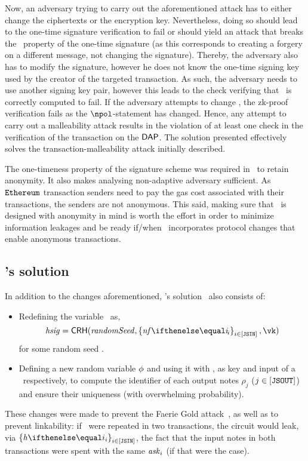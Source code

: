 Now, an adversary trying to carry out the aforementioned attack has to either change the ciphertexts or the encryption key. Nevertheless, doing so should lead to the one-time signature verification to fail or should yield an attack that breaks the \ufcma~property of the one-time signature (as this corresponds to creating a forgery on a different message, not changing the signature). Thereby, the adversary also has to modify the signature, however he does not know the one-time signing key used by the creator of the targeted transaction. As such, the adversary needs to use another signing key pair, however this leads to the check verifying that \hsig~is correctly computed to fail. If the adversary attempts to change \hsig, the zk-proof verification fails as the $\npol$-statement has changed. Hence, any attempt to carry out a malleability attack results in the violation of at least one check in the verification of the transaction on the $\mathsf{DAP}$. The solution presented effectively solves the transaction-malleability attack initially described.

\begin{remark}
    The one-timeness property of the signature scheme was required in \zerocash~to retain anonymity. It also makes analysing non-adaptive adversary sufficient. As $\texttt{Ethereum}{}$ transaction senders need to pay the gas cost associated with their transactions, the senders are not anonymous. This said, making sure that \zeth~is designed with anonymity in mind is worth the effort in order to minimize information leakages and be ready if/when \ethereum~incorporates protocol changes that enable anonymous transactions.
\end{remark}

\subsection{\zcash's solution}\label{appendix:trnm:ssec:zcash-trnm}

In addition to the changes aforementioned, \zcash's solution~\cite{zcashprotocol} also consists of:
\begin{itemize}
    \item Redefining the variable \hsig~as,
    \[
        \hsig = \crh(\randomSeed, \indexedset{\nf{i}}{i \in [\jsin]}, \vk)
    \]
    for some random seed \randomSeed.
\item Defining a new random variable $\mathit{\phi}$ and using it with \hsig, as key and input of a \prf~respectively, to compute the identifier of each output notes $\rho_j$ ($j \in [\mathtt{JSOUT}]$) and ensure their uniqueness (with overwhelming probability).
\end{itemize}
These changes were made to prevent the Faerie Gold attack~\cite[Section 8.4]{zcashprotocol}, as well as to prevent linkability: if \hsig~were repeated in two transactions, the circuit would leak, via $\indexedset{\htag{i}}{i \in [\jsin]}$, the fact that the input notes in both transactions were spent with the same $\mathit{ask}_{i}$ (if that were the case).

